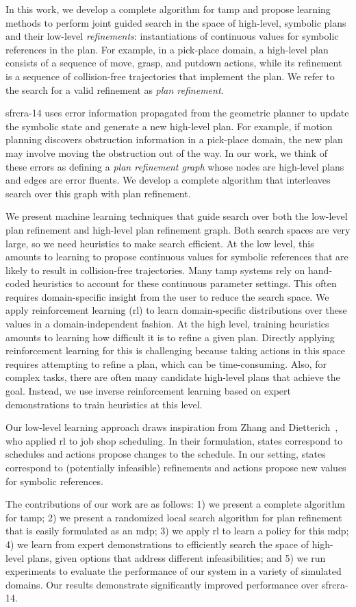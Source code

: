 In this work, we develop a complete algorithm for {\sc tamp} and propose learning
methods to perform joint guided search in the space of
high-level, symbolic plans and their low-level
\emph{refinements}: instantiations of continuous values for
symbolic references in the plan. For example, in a pick-place domain, a high-level plan
consists of a sequence of move, grasp, and putdown actions, while its refinement is a sequence of
collision-free trajectories that implement the plan. We refer to the search for a valid
refinement as \emph{plan refinement}.

{\sc sfrcra-14} uses error information propagated from the geometric planner
to update the symbolic state and generate a new high-level plan.
For example, if motion planning discovers obstruction information in a pick-place domain, the
new plan may involve moving the obstruction out of the way.
In our work, we think of these errors as defining a \emph{plan refinement graph} whose nodes are high-level plans
and edges are error fluents. We develop a complete algorithm that interleaves
search over this graph with plan refinement.

We present machine learning techniques that guide
search over both the low-level plan refinement and high-level plan refinement graph.
Both search spaces are very large, so we need heuristics to make search efficient.
At the low level, this amounts to
learning to propose continuous values for symbolic references that are likely to result in
collision-free trajectories. Many {\sc tamp} systems rely on hand-coded heuristics to
account for these continuous parameter settings. This often requires
domain-specific insight from the user to reduce the search space.
We apply reinforcement learning ({\sc rl}) to learn domain-specific distributions
over these values in a domain-independent fashion.
At the high level, training heuristics amounts to learning
how difficult it is to refine a given plan. Directly applying reinforcement learning
for this is challenging because taking actions in this space requires attempting to
refine a plan, which can be time-consuming. Also, for complex tasks, there are often many candidate high-level plans that
achieve the goal. Instead, we use inverse reinforcement learning
based on expert demonstrations to train heuristics at this level.

Our low-level learning approach draws inspiration
from Zhang and Dietterich~\cite{JobShopSched}, who applied {\sc rl} to job
shop scheduling. In their formulation, states correspond to schedules
and actions propose changes to the schedule. In our setting, states
correspond to (potentially infeasible) refinements and actions propose
new values for symbolic references.

The contributions of our work are as follows: 1)
we present a complete algorithm for {\sc tamp}; 2) we present a randomized
local search algorithm for plan refinement that is easily formulated
as an {\sc mdp}; 3) we apply {\sc rl} to learn
a policy for this {\sc mdp}; 4) we learn from expert demonstrations to
efficiently search the space of high-level plans,
given options that address different infeasibilities; and 5)
we run experiments to evaluate the performance of our system in a
variety of simulated domains. Our results demonstrate
significantly improved performance over {\sc sfrcra-14}.